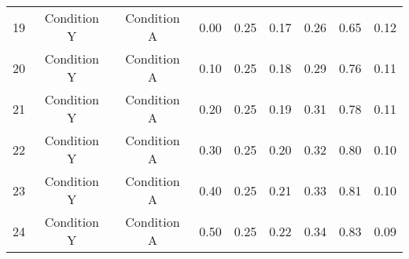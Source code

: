 \begin{table}[H]
\begin{adjustbox}{width=\textwidth}
\begin{tabular}{|rcccccccc|}
   \hline
  19 & Condition Y & Condition A & 0.00 & 0.25 & 0.17 & 0.26 & 0.65 & 0.12 \\ 
  20 & Condition Y & Condition A & 0.10 & 0.25 & 0.18 & 0.29 & 0.76 & 0.11 \\ 
  21 & Condition Y & Condition A & 0.20 & 0.25 & 0.19 & 0.31 & 0.78 & 0.11 \\ 
  22 & Condition Y & Condition A & 0.30 & 0.25 & 0.20 & 0.32 & 0.80 & 0.10 \\ 
  23 & Condition Y & Condition A & 0.40 & 0.25 & 0.21 & 0.33 & 0.81 & 0.10 \\ 
  24 & Condition Y & Condition A & 0.50 & 0.25 & 0.22 & 0.34 & 0.83 & 0.09 \\ 
   \hline
\end{tabular}
\end{adjustbox}
\end{table}


\newpage


